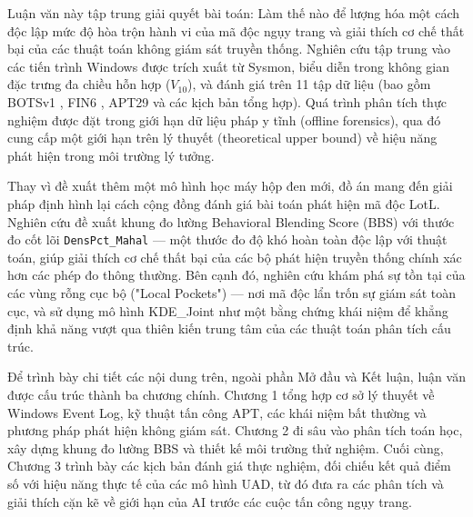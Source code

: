 \documentclass[../main.tex]{subfiles}
\begin{document}
Luận văn này tập trung giải quyết bài toán: Làm thế nào để lượng hóa một cách độc lập mức độ hòa trộn hành vi của mã độc ngụy trang và giải thích cơ chế thất bại của các thuật toán không giám sát truyền thống. Nghiên cứu tập trung vào các tiến trình Windows được trích xuất từ Sysmon, biểu diễn trong không gian đặc trưng đa chiều hỗn hợp ($V_{10}$), và đánh giá trên 11 tập dữ liệu (bao gồm BOTSv1 \cite{botsv1}, FIN6 \cite{mitre_fin6}, APT29 \cite{mitre_apt29} và các kịch bản tổng hợp). Quá trình phân tích thực nghiệm được đặt trong giới hạn dữ liệu pháp y tĩnh (offline forensics), qua đó cung cấp một giới hạn trên lý thuyết (theoretical upper bound) về hiệu năng phát hiện trong môi trường lý tưởng. 

Thay vì đề xuất thêm một mô hình học máy hộp đen mới, đồ án mang đến giải pháp định hình lại cách cộng đồng đánh giá bài toán phát hiện mã độc LotL. Nghiên cứu đề xuất khung đo lường Behavioral Blending Score (BBS) với thước đo cốt lõi \texttt{DensPct\_Mahal} — một thước đo độ khó hoàn toàn độc lập với thuật toán, giúp giải thích cơ chế thất bại của các bộ phát hiện truyền thống chính xác hơn các phép đo thông thường. Bên cạnh đó, nghiên cứu khám phá sự tồn tại của các vùng rỗng cục bộ ("Local Pockets") — nơi mã độc lẩn trốn sự giám sát toàn cục, và sử dụng mô hình KDE\_Joint như một bằng chứng khái niệm để khẳng định khả năng vượt qua thiên kiến trung tâm của các thuật toán phân tích cấu trúc.

Để trình bày chi tiết các nội dung trên, ngoài phần Mở đầu và Kết luận, luận văn được cấu trúc thành ba chương chính. Chương 1 tổng hợp cơ sở lý thuyết về Windows Event Log, kỹ thuật tấn công APT, các khái niệm bất thường và phương pháp phát hiện không giám sát. Chương 2 đi sâu vào phân tích toán học, xây dựng khung đo lường BBS và thiết kế môi trường thử nghiệm. Cuối cùng, Chương 3 trình bày các kịch bản đánh giá thực nghiệm, đối chiếu kết quả điểm số với hiệu năng thực tế của các mô hình UAD, từ đó đưa ra các phân tích và giải thích cặn kẽ về giới hạn của AI trước các cuộc tấn công ngụy trang.
\end{document}
